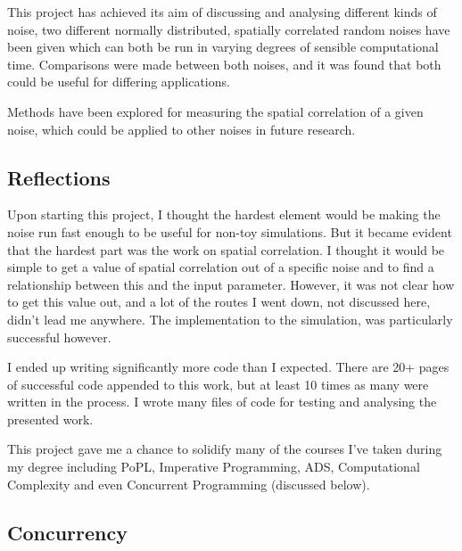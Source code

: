 \documentclass[11pt,a4paper]{article}
\begin{document}
This project has achieved its aim of discussing and analysing different kinds of noise, two different normally distributed, spatially correlated random noises have been given which can both be run in varying degrees of sensible computational time. Comparisons were made between both noises, and it was found that both could be useful for differing applications.

Methods have been explored for measuring the spatial correlation of a given noise, which could be applied to other noises in future research.

\subsection{Reflections}

Upon starting this project, I thought the hardest element would be making the noise run fast enough to be useful for non-toy simulations. But it became evident that the hardest part was the work on spatial correlation. I thought it would be simple to get a value of spatial correlation out of a specific noise and to find a relationship between this and the input parameter. However, it was not clear how to get this value out, and a lot of the routes I went down, not discussed here, didn’t lead me anywhere. The implementation to the simulation, was particularly successful however.

I ended up writing significantly more code than I expected. There are 20+ pages of successful code appended to this work, but at least 10 times as many were written in the process. I wrote many files of code for testing and analysing the presented work.

This project gave me a chance to solidify many of the courses I've taken during my degree including PoPL, Imperative Programming, ADS, Computational Complexity and even Concurrent Programming  \cite{cp} (discussed below).

\subsection{Concurrency}
\end{document}

